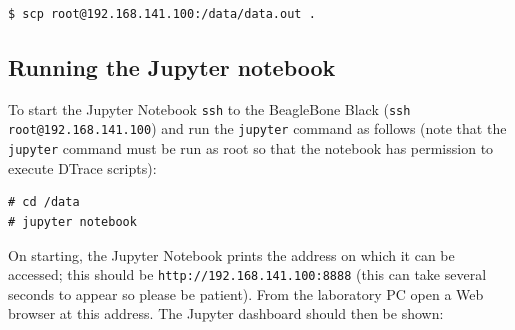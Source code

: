 \documentclass[a4paper,10pt]{article}
\begin{document}
\begin{small}
\begin{verbatim}
$ scp root@192.168.141.100:/data/data.out .
\end{verbatim}
\end{small}

%
%
%
%

\subsection*{Running the Jupyter notebook}

To start the Jupyter Notebook \texttt{ssh} to the BeagleBone Black (\texttt{ssh
root@192.168.141.100}) and run the \texttt{jupyter} command as follows (note
that the \texttt{jupyter} command must be run as root so that the notebook has
permission to execute DTrace scripts):

\begin{verbatim}
# cd /data
# jupyter notebook
\end{verbatim}

On starting, the Jupyter Notebook prints the address on which it can be
accessed; this should be \newline \texttt{http://192.168.141.100:8888} (this can take several seconds to appear so please be patient).  From
the laboratory PC open a Web browser at this address.  The Jupyter dashboard
should then be shown:
\end{document}
